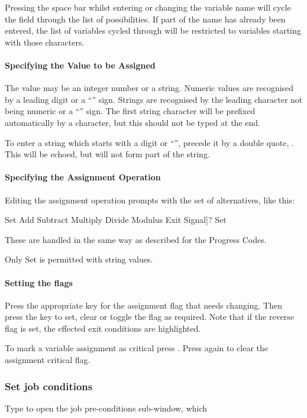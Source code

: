 Pressing the space bar whilst entering or changing the variable name
will cycle the field through the list of possibilities. If part of the
name has already been entered, the list of variables cycled through
will be restricted to variables starting with those characters.

\paragraph{Specifying the Value to be Assigned}
The value may be an integer number or a string. Numeric values are
recognised by a leading digit or a
``\userentry{{}-}'' sign. Strings
are recognised by the leading character not being numeric or a
``\userentry{{}-}'' sign. The
first string character will be prefixed automatically by a
{\textquotedbl} character, but this should not be typed at the end.

To enter a string which starts with a digit or
``\userentry{{}-}'', precede it by
a double quote, . This will be
echoed, but will not form part of the string.

\paragraph{Specifying the Assignment Operation}
Editing the assignment operation prompts with the set of alternatives,
like this:

\begin{expara}

Set Add Subtract Multiply Divide Modulus Exit Signal]? Set

\end{expara}

These are handled in the same way as described for the Progress Codes.

Only Set is permitted with string values.

\paragraph{Setting the flags}
Press the appropriate key for the assignment flag that needs changing.
Then press the key to set, clear or toggle the flag as required. Note
that if the reverse flag is set, the effected exit conditions are
highlighted.

To mark a variable assignment as critical press
. Press  again to clear
the assignment critical flag.

\subsubsection{Set job conditions}
Type  to open the job pre-conditions sub-window,
which

